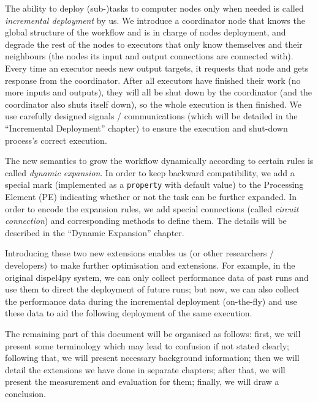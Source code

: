 The ability to deploy (sub-)tasks to computer nodes only when needed is called \emph{incremental deployment} by us. We introduce a coordinator node that knows the global structure of the workflow and is in charge of nodes deployment, and degrade the rest of the nodes to executors that only know themselves and their neighbours (\ie the nodes its input and output connections are connected with). Every time an executor needs new output targets, it requests that node and gets response from the coordinator. After all executors have finished their work (\ie no more inputs and outputs), they will all be shut down by the coordinator (and the coordinator also shuts itself down), so the whole execution is then finished. We use carefully designed signals / communications (which will be detailed in the ``Incremental Deployment'' chapter) to ensure the execution and shut-down process's correct execution.

The new semantics to grow the workflow dynamically according to certain rules is called \emph{dynamic expansion}. In order to keep backward compatibility, we add a special mark (implemented as a \lstinline|property| with default value) to the Processing Element (PE) indicating whether or not the task can be further expanded. In order to encode the expansion rules, we add special connections (called \emph{circuit connection}) and corresponding methods to define them. The details will be described in the ``Dynamic Expansion'' chapter.

Introducing these two new extensions enables us (or other researchers / developers) to make further optimisation and extensions. For example, in the original dispel4py system, we can only collect performance data of past runs and use them to direct the deployment of future runs; but now, we can also collect the performance data during the incremental deployment (\ie on-the-fly) and use these data to aid the following deployment of the same execution.

The remaining part of this document will be organised as follows: first, we will present some terminology which may lead to confusion if not stated clearly; following that, we will present necessary background information; then we will detail the extensions we have done in separate chapters; after that, we will present the measurement and evaluation for them; finally, we will draw a conclusion.
